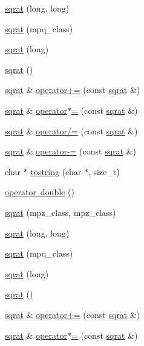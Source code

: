 \begin{DoxyCompactItemize}
\item 
\mbox{\hyperlink{classsqrat_a37c42a6db5d602e438935e2a8396b960}{sqrat}} (long, long)
\item 
\mbox{\hyperlink{classsqrat_a9ae811495db9b4763bef65bbb4be6260}{sqrat}} (mpq\+\_\+class)
\item 
\mbox{\hyperlink{classsqrat_a5a582658adaae3fa6e4a2833c20b657d}{sqrat}} (long)
\item 
\mbox{\hyperlink{classsqrat_a133ea2fa104facfe3057277d096235d2}{sqrat}} ()
\item 
\mbox{\hyperlink{classsqrat}{sqrat}} \& \mbox{\hyperlink{classsqrat_ada81ae4a5701bba66394cf1a69786e70}{operator+=}} (const \mbox{\hyperlink{classsqrat}{sqrat}} \&)
\item 
\mbox{\hyperlink{classsqrat}{sqrat}} \& \mbox{\hyperlink{classsqrat_aae14e57b87f37f2073e809efd51fbe8e}{operator$\ast$=}} (const \mbox{\hyperlink{classsqrat}{sqrat}} \&)
\item 
\mbox{\hyperlink{classsqrat}{sqrat}} \& \mbox{\hyperlink{classsqrat_a348781af63f0a423ad0a84342fdccb49}{operator/=}} (const \mbox{\hyperlink{classsqrat}{sqrat}} \&)
\item 
\mbox{\hyperlink{classsqrat}{sqrat}} \& \mbox{\hyperlink{classsqrat_a774a997c67358fea54d41cd8f29bdd3a}{operator-\/=}} (const \mbox{\hyperlink{classsqrat}{sqrat}} \&)
\item 
char $\ast$ \mbox{\hyperlink{classsqrat_a0e94b27cf419cf8888da52e854f9d60b}{tostring}} (char $\ast$, size\+\_\+t)
\item 
\mbox{\hyperlink{classsqrat_af1d90ee59e36a87aa7a94dacdab875de}{operator double}} ()
\item 
\mbox{\hyperlink{classsqrat_a7c588af79fec6e3765efdd7475418a6a}{sqrat}} (mpz\+\_\+class, mpz\+\_\+class)
\item 
\mbox{\hyperlink{classsqrat_a37c42a6db5d602e438935e2a8396b960}{sqrat}} (long, long)
\item 
\mbox{\hyperlink{classsqrat_a9ae811495db9b4763bef65bbb4be6260}{sqrat}} (mpq\+\_\+class)
\item 
\mbox{\hyperlink{classsqrat_a5a582658adaae3fa6e4a2833c20b657d}{sqrat}} (long)
\item 
\mbox{\hyperlink{classsqrat_a133ea2fa104facfe3057277d096235d2}{sqrat}} ()
\item 
\mbox{\hyperlink{classsqrat}{sqrat}} \& \mbox{\hyperlink{classsqrat_ada81ae4a5701bba66394cf1a69786e70}{operator+=}} (const \mbox{\hyperlink{classsqrat}{sqrat}} \&)
\item 
\mbox{\hyperlink{classsqrat}{sqrat}} \& \mbox{\hyperlink{classsqrat_aae14e57b87f37f2073e809efd51fbe8e}{operator$\ast$=}} (const \mbox{\hyperlink{classsqrat}{sqrat}} \&)

\end{DoxyCompactItemize}
